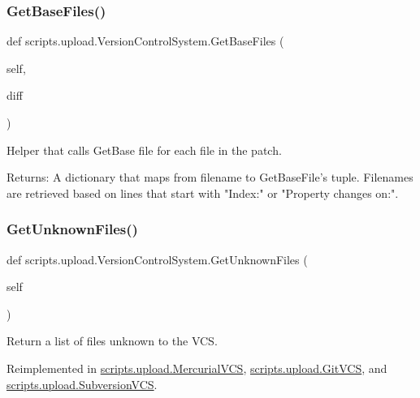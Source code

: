 \subsubsection{\texorpdfstring{GetBaseFiles()}{GetBaseFiles()}}
{\footnotesize\ttfamily def scripts.\+upload.\+Version\+Control\+System.\+Get\+Base\+Files (\begin{DoxyParamCaption}\item[{}]{self,  }\item[{}]{diff }\end{DoxyParamCaption})}

\begin{DoxyVerb}Helper that calls GetBase file for each file in the patch.

Returns:
  A dictionary that maps from filename to GetBaseFile's tuple.  Filenames
  are retrieved based on lines that start with "Index:" or
  "Property changes on:".
\end{DoxyVerb}
 \mbox{\label{classscripts_1_1upload_1_1_version_control_system_a622bbb4e8be9c1cdfde8aa1af1f7f553}} 
\subsubsection{\texorpdfstring{GetUnknownFiles()}{GetUnknownFiles()}}
{\footnotesize\ttfamily def scripts.\+upload.\+Version\+Control\+System.\+Get\+Unknown\+Files (\begin{DoxyParamCaption}\item[{}]{self }\end{DoxyParamCaption})}

\begin{DoxyVerb}Return a list of files unknown to the VCS.\end{DoxyVerb}
 

Reimplemented in \mbox{\hyperlink{classscripts_1_1upload_1_1_mercurial_v_c_s_ac8cd9647f5029dc05a0584cfb9933a6a}{scripts.\+upload.\+Mercurial\+V\+CS}}, \mbox{\hyperlink{classscripts_1_1upload_1_1_git_v_c_s_afab4ff2428d5e4220f376471aa53e90e}{scripts.\+upload.\+Git\+V\+CS}}, and \mbox{\hyperlink{classscripts_1_1upload_1_1_subversion_v_c_s_a30d4e7ce889cdfba5af7f43a7fac47f9}{scripts.\+upload.\+Subversion\+V\+CS}}.

